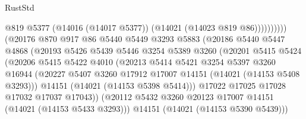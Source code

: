 \begin{lexlean}{RustStd}
\begin{coremodule}
                                          @819
                                          @5377
                                          (@14016 (@14017 @5377))
                                          (@14021 (@14023 @819 @86))))))))))
                          (@20176
                            @870
                            @917
                            @86
                            @5440
                            @5449
                            @3293
                            @5883
                            (@20186
                              @5440
                              @5447
                              @4868
                              (@20193
                                @5426
                                @5439
                                @5446
                                @3254
                                @5389
                                @3260
                                (@20201
                                  @5415
                                  @5424
                                  (@20206
                                    @5415
                                    @5422
                                    @4010
                                    (@20213
                                      @5414
                                      @5421
                                      @3254
                                      @5397
                                      @3260
                                      @16944
                                      (@20227
                                        @5407
                                        @3260
                                        @17912
                                        @17007
                                        @14151
                                        (@14021 (@14153 @5408 @3293)))
                                      @14151
                                      (@14021 (@14153 @5398 @5414)))
                                    @17022
                                    @17025
                                    @17028
                                    @17032
                                    @17037
                                    @17043))
                                (@20112
                                  @5432
                                  @3260
                                  @20123
                                  @17007
                                  @14151
                                  (@14021 (@14153 @5433 @3293)))
                                @14151
                                (@14021 (@14153 @5390 @5439)))

\end{coremodule}
\end{lexlean}
